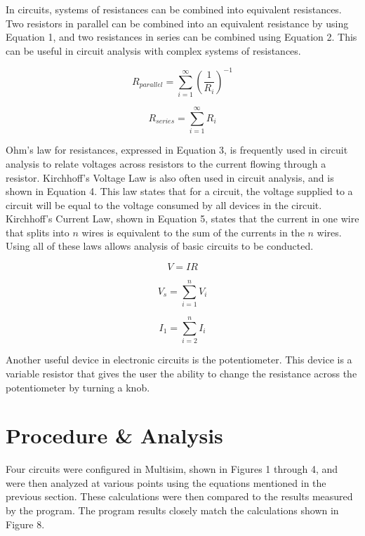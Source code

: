 \documentclass[12pt]{article}
\begin{document}
In circuits, systems of resistances can be combined into equivalent resistances. Two resistors in parallel can be combined into an equivalent resistance by using Equation 1, and two resistances in series can be combined using Equation 2. This can be useful in circuit analysis with complex systems of resistances. 
\bigskip
 
 \begin{equation}
 R_{parallel} =  \sum_{i=1}^{\infty}
 	(\frac{1}{R_{i}})^{-1}
 \end{equation}
 \bigskip
 
 \begin{equation}
 R_{series} =  \sum_{i=1}^{\infty}
	R_{i}
 \end{equation}
 \bigskip
 
 
 
 Ohm's law for resistances, expressed in Equation 3, is frequently used in circuit analysis to relate voltages across resistors to the current flowing through a resistor. Kirchhoff's Voltage Law is also often used in circuit analysis, and is shown in Equation 4. This law states that for a circuit, the voltage supplied to a circuit will be equal to the voltage consumed by all devices in the circuit. Kirchhoff's Current Law, shown in Equation 5, states that the current in one wire that splits into $n$ wires is equivalent to the sum of the currents in the $n$ wires. Using all of these laws allows analysis of basic circuits to be conducted.
 \bigskip
 
 
\begin{equation}
V = IR
\end {equation}
\bigskip

\begin{equation}
V_{s} = \sum_{i=1}^{n}
V_{i}
\end{equation}
\bigskip

\begin{equation}
I_{1} =  \sum_{i=2}^{n}
I_{i}
\end{equation}
\bigskip

Another useful device in electronic circuits is the potentiometer. This device is a variable resistor that gives the user the ability to change the resistance across the potentiometer by turning a knob. 

\section*{\fontsize{12}{12}\selectfont \large Procedure \& Analysis}
Four circuits were configured in Multisim, shown in Figures 1 through 4, and were then analyzed at various points using the equations mentioned in the previous section. These calculations were then compared to the results measured by the program. The program results closely match the calculations shown in Figure 8.
\bigskip
\end{document}
